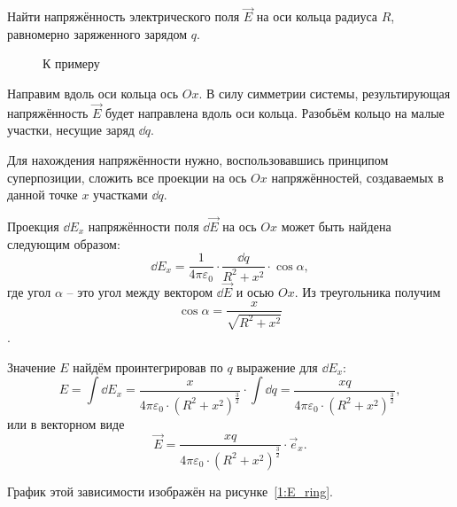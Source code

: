     \begin{example}
        Найти напряжённость электрического поля \( \vec{E} \) на оси кольца
        радиуса \( R \), равномерно заряженного зарядом \( q \).
    \end{example}

    \begin{figure}[b]
        \center
        \hfill
        \caption{К примеру}
    \end{figure}

    \begin{solution}
        Направим вдоль оси кольца ось \( Ox \). В силу симметрии системы,
        результирующая напряжённость \( \vec{E} \) будет направлена вдоль оси
        кольца. Разобьём кольцо на малые участки, несущие заряд \( \dd q \).

        Для нахождения напряжённости нужно, воспользовавшись принципом
        суперпозиции, сложить все проекции на ось \( Ox \) напряжённостей,
        создаваемых в данной точке \( x \) участками \( \dd q \).

        Проекция \( \dd E_x \) напряжённости поля \( \dd\vec{E} \) на ось
        \( Ox \) может быть найдена следующим образом:
        \[
            \dd E_x = \frac{1}{4\pi\varepsilon_0}\cdot
            \frac{\dd q}{R^2+x^2}\cdot\cos\alpha,
        \]
        где угол \( \alpha \) -- это угол между вектором \( \dd\vec{E} \) и
        осью \( Ox \). Из треугольника получим
        \[ \cos\alpha = \frac{x}{\sqrt{R^2+x^2}} \].

        Значение \( E \) найдём проинтегрировав по \( q \) выражение для
        \( \dd E_{x} \):
        \[
            E = \int \dd E_{x} = \frac{x}{4\pi\varepsilon_0\cdot
            (R^2+x^2)^\frac{3}{2}}\cdot\int \dd q =
            \frac{xq}{4\pi\varepsilon_0\cdot(R^2+x^2)^\frac{3}{2}},
        \]
        или в векторном виде
        \[
            \vec{E} = \frac{xq}{4\pi\varepsilon_0\cdot
            (R^2+x^2)^\frac{3}{2}}\cdot\vec{e}_{x}.
        \]

        График этой зависимости изображён на рисунке~\ref{1:E_ring}.
    \end{solution}

